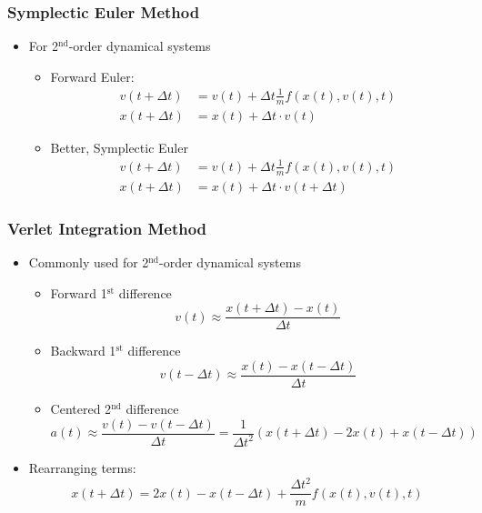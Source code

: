 \documentclass{article}
\begin{document}
\subsubsection*{Symplectic Euler Method}
\begin{itemize}
    \item For 2$^{\text{nd}}$-order dynamical systems
    \begin{itemize}
        \item Forward Euler:
        \begin{align*}
            v(t + \Delta t) &= v(t) + \Delta t \frac{1}{m} f(x(t), v(t), t)\\
            x(t + \Delta t) &= x(t) + \Delta t \cdot v(t)
        \end{align*}
        \item Better, Symplectic Euler
        \begin{align*}
            v(t + \Delta t) &= v(t) + \Delta t \frac{1}{m} f(x(t), v(t), t)\\
            x(t + \Delta t) &= x(t) + \Delta t \cdot v(t + \Delta t)
        \end{align*}
    \end{itemize}
\end{itemize}

\subsubsection*{Verlet Integration Method}
\begin{itemize}
    \item Commonly used for 2$^{\text{nd}}$-order dynamical systems
    \begin{itemize}
        \item Forward 1$^{\text{st}}$ difference
        \[v(t) \approx \frac{ x(t + \Delta t) - x(t)}{\Delta t}\]
        \item Backward 1$^{\text{st}}$ difference
        \[v(t - \Delta t) \approx \frac{ x(t) - x(t - \Delta t)}{\Delta t}\]
        \item Centered 2$^{\text{nd}}$ difference
        \[a(t) \approx \frac{v(t) - v(t - \Delta t)}{\Delta t} = \frac{1}{\Delta t^2}(x(t + \Delta t) - 2x(t) + x(t - \Delta t))\]
    \end{itemize}
    \item Rearranging terms:
    \[x(t + \Delta t) = 2x(t) - x(t - \Delta t) + \frac{\Delta t^2}{m} f(x(t), v(t), t)\]
\end{itemize}
\end{document}
